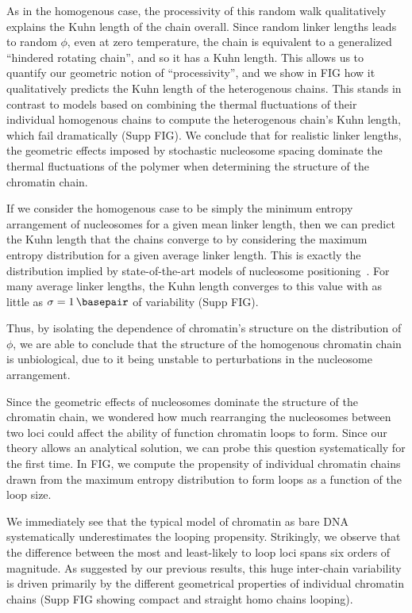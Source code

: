 \documentclass[%
 reprint,
superscriptaddress,
showpacs,preprintnumbers,
 amsmath,amssymb,
 aps,
 prl,
]{revtex4-1}
\begin{document}
As in the homogenous case, the processivity of this random walk qualitatively
explains the Kuhn length of the chain overall. Since random linker lengths leads
to random $\phi$, even at zero temperature, the chain is equivalent to a
generalized ``hindered rotating chain'', and so it has a Kuhn length. This
allows us to quantify our geometric notion of ``processivity'', and we show in
FIG how it qualitatively predicts the Kuhn length of the heterogenous chains.
This stands in contrast to models based on combining the thermal fluctuations of
their individual homogenous chains to compute the heterogenous chain's Kuhn
length, which fail dramatically (Supp FIG). We conclude that for realistic
linker lengths, the geometric effects imposed by stochastic nucleosome spacing
dominate the thermal fluctuations of the polymer when determining the structure
of the chromatin chain.

If we consider the homogenous case to be simply the minimum entropy arrangement
of nucleosomes for a given mean linker length, then we can predict the Kuhn
length that the chains converge to by considering the maximum entropy
distribution for a given average linker length.
This is exactly the distribution
implied by state-of-the-art models of nucleosome positioning~\cite{beshnova2014}.
For many average linker lengths, the Kuhn length converges to this value with as
little as $\sigma = \SI{1}{\basepair}$ of variability (Supp FIG).

Thus, by isolating the dependence of chromatin's structure on the distribution of
$\phi$, we are able to conclude that the structure of the homogenous chromatin
chain is unbiological, due to it being unstable to perturbations in the
nucleosome arrangement.


Since the geometric effects of nucleosomes dominate the structure of the
chromatin chain, we wondered how much rearranging the nucleosomes between two
loci could affect the ability of function chromatin loops to form.
Since our theory allows an analytical solution, we can probe this question
systematically for the first time.
In FIG, we compute the propensity of individual chromatin chains drawn from the maximum
entropy distribution to form loops as a function of the loop size.

We immediately see that the typical model of chromatin as bare DNA
systematically underestimates the looping propensity.
Strikingly, we observe that the difference between the most and least-likely to
loop loci spans six orders of magnitude.
As suggested by our previous results, this huge inter-chain variability is
driven primarily by the different geometrical properties of individual chromatin
chains (Supp FIG showing compact and straight homo chains looping).
\end{document}
